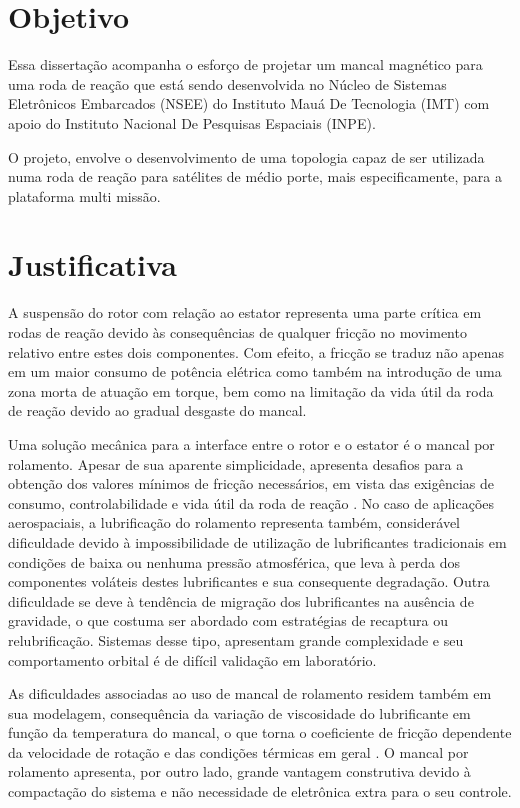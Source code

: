 \section{Objetivo}

Essa dissertação acompanha o esforço de projetar um mancal magnético para uma roda de reação que está sendo desenvolvida no Núcleo de Sistemas Eletrônicos Embarcados (NSEE) do Instituto Mauá De Tecnologia (IMT) com apoio do Instituto Nacional De Pesquisas Espaciais (INPE).

O projeto, envolve o desenvolvimento de uma topologia capaz de ser utilizada numa roda de reação para satélites de médio porte, mais especificamente, para a plataforma multi missão.


\section{Justificativa}

A suspensão do rotor com relação ao estator representa uma parte crítica em rodas de reação \citep{taniwaki2003experimental} devido às consequências de qualquer fricção no movimento relativo entre estes dois componentes. Com efeito, a fricção se traduz não apenas em um maior consumo de potência elétrica como também na introdução de uma zona morta de atuação em torque, bem como na limitação da vida útil da roda de reação devido ao gradual desgaste do mancal.

Uma solução mecânica para a interface entre o rotor e o estator é o mancal por rolamento. Apesar de sua aparente simplicidade, apresenta desafios para a obtenção dos valores mínimos de fricção necessários, em vista das exigências de consumo, controlabilidade e vida útil da roda de reação \citep{Krishnan2010}. No caso de aplicações aerospaciais, a lubrificação do rolamento representa também, considerável dificuldade devido à impossibilidade de utilização de lubrificantes tradicionais em condições de baixa ou nenhuma pressão atmosférica, que leva à perda dos componentes voláteis destes lubrificantes e sua consequente degradação. Outra dificuldade se deve à tendência de migração dos lubrificantes na ausência de gravidade, o que costuma ser abordado com estratégias de recaptura ou relubrificação. Sistemas desse tipo, apresentam grande complexidade e seu comportamento orbital é de difícil validação em laboratório.

As dificuldades associadas ao uso de mancal de rolamento residem também em sua modelagem, consequência da variação de viscosidade do lubrificante em função da temperatura do mancal, o que torna o coeficiente de fricção dependente da velocidade de rotação e das condições térmicas em geral \citep{Carrara2007}. O mancal por rolamento apresenta, por outro lado, grande vantagem construtiva devido à compactação do sistema e não necessidade de eletrônica extra para o seu controle. 

